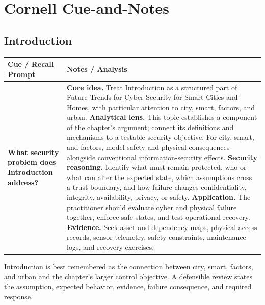 \documentclass[11pt]{article}
\newcommand{\CornellHeader}{%
\rowcolor{Navy}\color{white}\bfseries Cue / Recall Prompt & \color{white}\bfseries Notes / Analysis\\\hline}
\newcommand{\CornellRow}[2]{%
\cellcolor{CueGray}\RaggedRight\textbf{#1} & \RaggedRight #2\\\hline}
\begin{document}
\section*{Cornell Cue-and-Notes}
\subsection*{Introduction}
\begin{longtable}{>{\RaggedRight\arraybackslash}p{}|>{\RaggedRight\arraybackslash}p{}}
\CornellHeader
\CornellRow{What security problem does Introduction address?}{\textbf{Core idea.} Treat Introduction as a structured part of Future Trends for Cyber Security for Smart Cities and Homes, with particular attention to city, smart, factors, and urban. \textbf{Analytical lens.} This topic establishes a component of the chapter's argument; connect its definitions and mechanisms to a testable security objective. For city, smart, and factors, model safety and physical consequences alongside conventional information-security effects. \textbf{Security reasoning.} Identify what must remain protected, who or what can alter the expected state, which assumptions cross a trust boundary, and how failure changes confidentiality, integrity, availability, privacy, or safety. \textbf{Application.} The practitioner should evaluate cyber and physical failure together, enforce safe states, and test operational recovery. \textbf{Evidence.} Seek asset and dependency maps, physical-access records, sensor telemetry, safety constraints, maintenance logs, and recovery exercises.}
\end{longtable}
\begin{topicsummary}
Introduction is best remembered as the connection between city, smart, factors, and urban and the chapter's larger control objective. A defensible review states the assumption, expected behavior, evidence, failure consequence, and required response.
\end{topicsummary}
\end{document}
